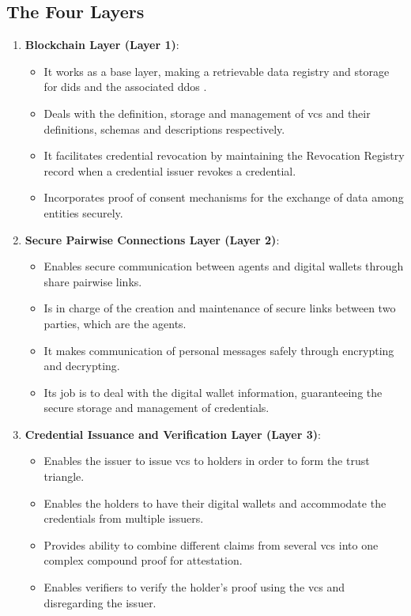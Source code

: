 \subsection{The Four Layers} 

\begin{enumerate}
  \item \textbf{Blockchain Layer (Layer 1)}:
  \begin{itemize}
    \item It works as a base layer, making a retrievable data registry and storage for \gls{did}s and the associated \gls{ddo}s \cite{DIDarchitecture}.
    \item Deals with the definition, storage and management of \gls{vc}s and their definitions, schemas and descriptions respectively.
    \item It facilitates credential revocation by maintaining the Revocation Registry record when a credential issuer revokes a credential.
    \item Incorporates proof of consent mechanisms for the exchange of data among entities securely.
  \end{itemize}
  
  \item \textbf{Secure Pairwise Connections Layer (Layer 2)}:
  \begin{itemize}
    \item Enables secure communication between agents and digital wallets through share pairwise links.
    \item Is in charge of the creation and maintenance of secure links between two parties, which are the agents.
    \item It makes communication of personal messages safely through encrypting and decrypting.
    \item Its job is to deal with the digital wallet information, guaranteeing the secure storage and management of credentials.
  \end{itemize}
  
  \item \textbf{Credential Issuance and Verification Layer (Layer 3)}:
  \begin{itemize}
    \item Enables the issuer to issue \gls{vc}s to holders in order to form the trust triangle.
    \item Enables the holders to have their digital wallets and accommodate the credentials from multiple issuers.
    \item Provides ability to combine different claims from several \gls{vc}s into one complex compound proof for attestation.
    \item Enables verifiers to verify the holder's proof using the \gls{vc}s and disregarding the issuer.
  \end{itemize}
  

\end{enumerate}

